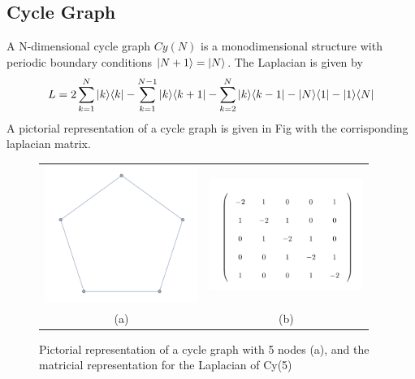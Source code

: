     \subsection*{Cycle Graph}
        A N-dimensional cycle graph $Cy(N)$ is a monodimensional structure with periodic boundary conditions ${|{N+1}\rangle}={|{N}\rangle}$. The Laplacian is given by
        \begin{equation}
            L = 2\sum_{k=1}^{N}{|{k}\rangle}{\langle{k}|} - \sum_{k=1}^{N-1}{|{k}\rangle}{\langle{k+1}|} - \sum_{k=2}^{N}{|{k}\rangle}{\langle{k-1}|}- {|{N}\rangle}{\langle{1}|}-{|{1}\rangle}{\langle{N}|}
        \end{equation}
        A pictorial representation of a cycle graph is given in Fig with the corrisponding laplacian matrix.
        \begin{figure}[ht]
          \centering
          \begin{tabular}{cc}
            \includegraphics[width=50mm]{./figures/chapter1/cycle} &   \includegraphics[width=50mm]{./figures/chapter1/cycleL} \\
          (a)  & (b) \\[6pt]
          \end{tabular}
          \caption[Pictorial representation of a cycle graph, and matricial representation for the Laplacian]{Pictorial representation of a cycle graph with 5 nodes (a), and the matricial representation for the Laplacian of Cy(5)}
        \end{figure}
    \vspace{-0.7cm}
